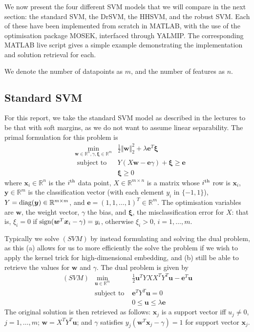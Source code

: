 \documentclass[11pt]{article}
\newcommand{\ds}{\displaystyle}
\begin{document}
We now present the four different SVM models that we will compare in the next section: the standard SVM, the DrSVM, the HHSVM, and the robust SVM. Each of these have been implemented from scratch in MATLAB, with the use of the optimisation package MOSEK, interfaced through YALMIP. The corresponding MATLAB live script gives a simple example demonstrating the implementation and solution retrieval for each.

We denote the number of datapoints as $m$, and the number of features as $n$. 

\subsection{Standard SVM}

For this report, we take the standard SVM model as described in the lectures to be that with soft margins, as we do not want to assume linear separability. The primal formulation for this problem is
\begin{eqnarray*}
& \ds \min_{\pmb{w}\in\mathbb{R}^n,\gamma,\pmb{\xi}\in\mathbb{R}^m} & \frac{1}{2}\Vert \bm{w} \Vert_2^2  + \lambda\bm{e}^T\bm{\xi} 
\\
& \mbox{ subject to } & Y(X\bm{w} - \bm{e}\gamma) + \bm{\xi} \geq \bm{e} 
\\
& & \bm{\xi} \geq 0
\end{eqnarray*}
where $\bm{x}_i\in\mathbb{R}^n$ is the $i^{\rm th}$ data point, $X\in\mathbb{R}^{m\times n}$ is a matrix whose $i^{\rm th}$ row is $\bm{x}_i$, $\bm{y}\in\mathbb{R}^m$ is the classification vector (with each element $y_i$ in $\{-1, 1\}$), $Y = {\rm diag}(\bm{y})\in\mathbb{R}^{m\times m}$, and $\bm{e} = (1, 1, \dots, 1)^T\in\mathbb{R}^{m}$. The optimisation variables are $\bm{w}$, the weight vector, $\gamma$ the bias, and $\bm{\xi}$, the misclassification error for $X$: that is, $\xi_i = 0$ if ${\rm sign}(\bm{w}^T\bm{x}_i - \gamma) = y_i$, otherwise $\xi_i > 0$, $i=1,\dots,m$. 

Typically we solve $(SVM)$ by instead formulating and solving the dual problem, as this (a) allows for us to more efficiently the solve the problem if we wish to apply the kernel trick for high-dimensional embedding, and (b) still be able to retrieve the values for $\bm{w}$ and $\gamma$. The dual problem is given by
\begin{eqnarray*}
(SVM) & \ds\min_{\pmb{u}\in\mathbb{R}^m} & \frac{1}{2} \bm{u}^TYXX^TY^T\bm{u} - \bm{e}^T\bm{u}
\\
& \mbox{subject to } & \bm{e}^TY^T\bm{u} = 0
\\
& & 0 \leq \bm{u} \leq \lambda\bm{e}
\end{eqnarray*}
The original solution is then retrieved as follows: $\bm{x}_j$ is a support vector iff $u_j\neq 0$, $j=1,\dots,m$; $\bm{w} = X^TY^T\bm{u}$; and $\gamma$ satisfies $y_j(\bm{w}^T\bm{x}_j - \gamma) = 1$ for support vector $\bm{x}_j$. 
\end{document}
